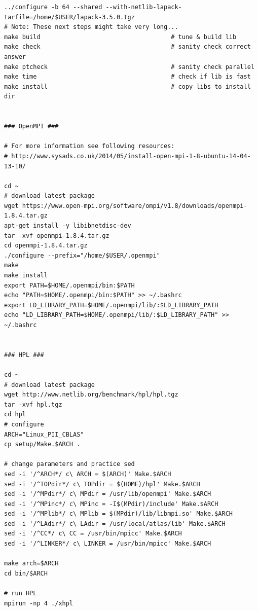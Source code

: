 \documentclass[10pt,twocolumn]{article}
\begin{document}
\begin{appendices}
\begin{lstlisting}
../configure -b 64 --shared --with-netlib-lapack-tarfile=/home/$USER/lapack-3.5.0.tgz
# Note: These next steps might take very long...
make build                                    # tune & build lib
make check                                    # sanity check correct answer
make ptcheck                                  # sanity check parallel
make time                                     # check if lib is fast
make install                                  # copy libs to install dir


### OpenMPI ###

# For more information see following resources:
# http://www.sysads.co.uk/2014/05/install-open-mpi-1-8-ubuntu-14-04-13-10/

cd ~
# download latest package
wget https://www.open-mpi.org/software/ompi/v1.8/downloads/openmpi-1.8.4.tar.gz
apt-get install -y libibnetdisc-dev
tar -xvf openmpi-1.8.4.tar.gz
cd openmpi-1.8.4.tar.gz
./configure --prefix="/home/$USER/.openmpi"
make
make install
export PATH=$HOME/.openmpi/bin:$PATH
echo "PATH=$HOME/.openmpi/bin:$PATH" >> ~/.bashrc
export LD_LIBRARY_PATH=$HOME/.openmpi/lib/:$LD_LIBRARY_PATH
echo "LD_LIBRARY_PATH=$HOME/.openmpi/lib/:$LD_LIBRARY_PATH" >> ~/.bashrc


### HPL ###

cd ~
# download latest package
wget http://www.netlib.org/benchmark/hpl/hpl.tgz
tar -xvf hpl.tgz
cd hpl
# configure
ARCH="Linux_PII_CBLAS"
cp setup/Make.$ARCH .

# change parameters and practice sed
sed -i '/^ARCH*/ c\ ARCH = $(ARCH)' Make.$ARCH
sed -i '/^TOPdir*/ c\ TOPdir = $(HOME)/hpl' Make.$ARCH
sed -i '/^MPdir*/ c\ MPdir = /usr/lib/openmpi' Make.$ARCH
sed -i '/^MPinc*/ c\ MPinc = -I$(MPdir)/include' Make.$ARCH
sed -i '/^MPlib*/ c\ MPlib = $(MPdir)/lib/libmpi.so' Make.$ARCH
sed -i '/^LAdir*/ c\ LAdir = /usr/local/atlas/lib' Make.$ARCH
sed -i '/^CC*/ c\ CC = /usr/bin/mpicc' Make.$ARCH
sed -i '/^LINKER*/ c\ LINKER = /usr/bin/mpicc' Make.$ARCH

make arch=$ARCH
cd bin/$ARCH

# run HPL
mpirun -np 4 ./xhpl
\end{lstlisting}

\newpage

\end{appendices}
\end{document}
